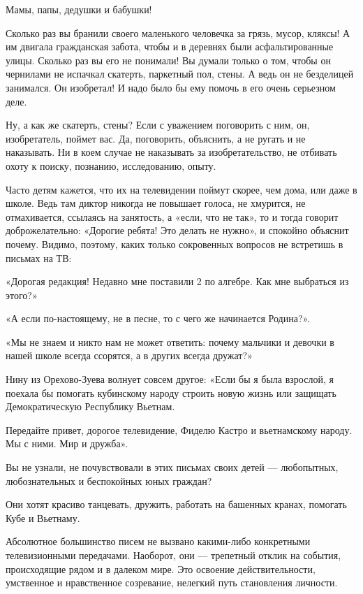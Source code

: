 \documentclass[12pt, a4paper, openany]{book}
\begin{document}
Мамы, папы, дедушки и бабушки! 

Сколько раз вы бранили своего маленького человечка за грязь, мусор, кляксы! А им двигала гражданская забота, чтобы и в деревнях были асфальтированные улицы. Сколько раз вы его не понимали! Вы думали только о том, чтобы он чернилами не испачкал скатерть, паркетный пол, стены. А ведь он не безделицей занимался. Он изобретал! И надо было бы ему помочь в его очень серьезном деле. 

Ну, а как же скатерть, стены? Если с уважением поговорить с ним, он, изобретатель, поймет вас. Да, поговорить, объяснить, а не ругать и не наказывать. Ни в коем случае не наказывать за изобретательство, не отбивать охоту к поиску, познанию, исследованию, опыту. 

Часто детям кажется, что их на телевидении поймут скорее, чем дома, или даже в школе. Ведь там диктор никогда не повышает голоса, не хмурится, не отмахивается, ссылаясь на занятость, а «если, что не так», то и тогда говорит доброжелательно: «Дорогие ребята! Это делать не нужно», и спокойно объяснит почему. Видимо, поэтому, каких только сокровенных вопросов не встретишь в письмах на ТВ: 

«Дорогая редакция! Недавно мне поставили 2 по алгебре. Как мне выбраться из этого?» 

«А если по-настоящему, не в песне, то с чего же начинается Родина?». 

«Мы не знаем и никто нам не может ответить: почему мальчики и девочки в нашей школе всегда ссорятся, а в других всегда дружат?» 

Нину из Орехово-Зуева волнует совсем другое: «Если бы я была взрослой, я поехала бы помогать кубинскому народу строить новую жизнь или защищать Демократическую Республику Вьетнам. 

Передайте привет, дорогое телевидение, Фиделю Кастро и вьетнамскому народу. Мы с ними. Мир и дружба». 

Вы не узнали, не почувствовали в этих письмах своих детей — любопытных, любознательных и беспокойных юных граждан? 

Они хотят красиво танцевать, дружить, работать на башенных кранах, помогать Кубе и Вьетнаму. 

Абсолютное большинство писем не вызвано какими-либо конкретными телевизионными передачами. Наоборот, они — трепетный отклик на события, происходящие рядом и в далеком мире. Это освоение действительности, умственное и нравственное созревание, нелегкий путь становления личности. 
\end{document}
